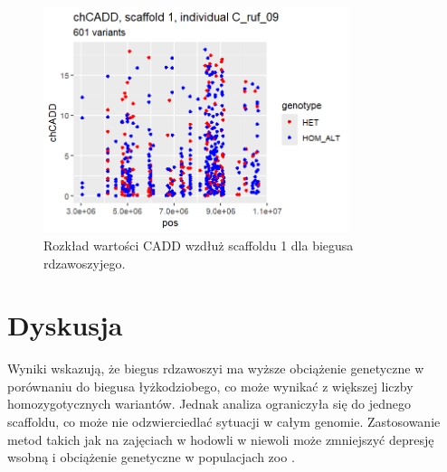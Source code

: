 \documentclass[a4paper, 12pt]{article}
\begin{document}
\begin{figure}[H]
    \centering
    \includegraphics[width=0.8\textwidth]{img/chCADD_C_ruf_09.png}
    \caption{Rozkład wartości CADD wzdłuż scaffoldu 1 dla biegusa rdzawoszyjego.}
    \label{fig:cadd_ruf}
\end{figure}

\section{Dyskusja}
Wyniki wskazują, że biegus rdzawoszyi ma wyższe obciążenie genetyczne w porównaniu do biegusa łyżkodziobego, co może wynikać z większej liczby homozygotycznych wariantów. Jednak analiza ograniczyła się do jednego scaffoldu, co może nie odzwierciedlać sytuacji w całym genomie. Zastosowanie metod takich jak na zajęciach w hodowli w niewoli może zmniejszyć depresję wsobną i obciążenie genetyczne w populacjach zoo \cite{Speak2024}.



\end{document}
